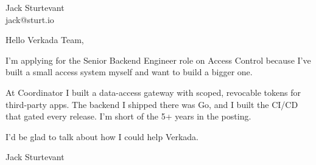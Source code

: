 \documentclass[11pt]{article}
\begin{document}
\raggedright

{\namefont\fontsize{20pt}{24pt}\selectfont Jack Sturtevant}\\[-0.3em]
jack@sturt.io

\vspace{1.2em}

Hello Verkada Team,

I'm applying for the Senior Backend Engineer role on Access Control because I've built a small access system myself and want to build a bigger one.

At Coordinator I built a data-access gateway with scoped, revocable tokens for third-party apps. The backend I shipped there was Go, and I built the CI/CD that gated every release. I'm short of the 5+ years in the posting.

I'd be glad to talk about how I could help Verkada.

\vspace{0.6em}
Jack Sturtevant
\end{document}
